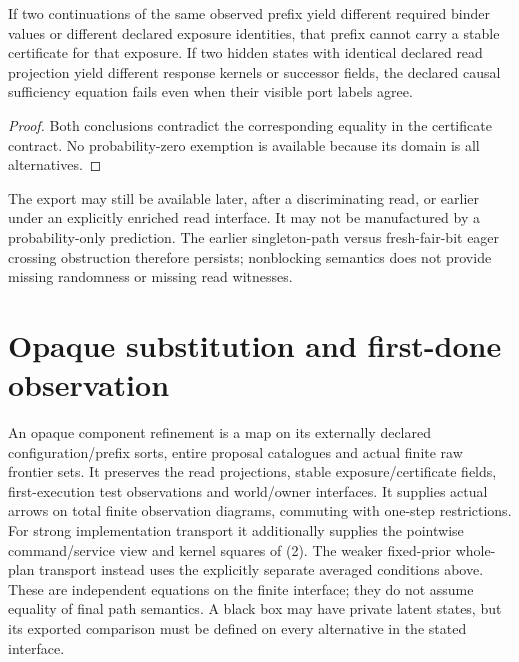 \documentclass{article}
\begin{document}
\begin{proposition}
If two continuations of the same observed prefix yield different required binder values or different declared exposure identities, that prefix cannot carry a stable certificate for that exposure. If two hidden states with identical declared read projection yield different response kernels or successor fields, the declared causal sufficiency equation fails even when their visible port labels agree.
\end{proposition}
\begin{proof}
Both conclusions contradict the corresponding equality in the certificate contract. No probability-zero exemption is available because its domain is all alternatives.
\end{proof}
The export may still be available later, after a discriminating read, or earlier under an explicitly enriched read interface. It may not be manufactured by a probability-only prediction. The earlier singleton-path versus fresh-fair-bit eager crossing obstruction therefore persists; nonblocking semantics does not provide missing randomness or missing read witnesses.


\section{Opaque substitution and first-done observation}
An opaque component refinement is a map on its externally declared configuration/prefix sorts, entire proposal catalogues and actual finite raw frontier sets. It preserves the read projections, stable exposure/certificate fields, first-execution test observations and world/owner interfaces. It supplies actual arrows on total finite observation diagrams, commuting with one-step restrictions. For strong implementation transport it additionally supplies the pointwise command/service view and kernel squares of (2). The weaker fixed-prior whole-plan transport instead uses the explicitly separate averaged conditions above. These are independent equations on the finite interface; they do not assume equality of final path semantics. A black box may have private latent states, but its exported comparison must be defined on every alternative in the stated interface.
\end{document}
